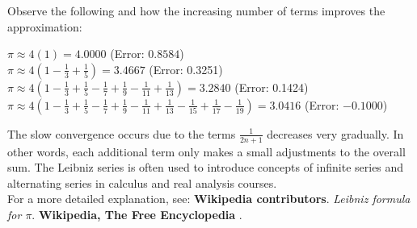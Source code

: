 \documentclass[12pt]{article}
\begin{document}
\noindent Observe the following and how the increasing number of terms improves the approximation:
\begin{center}
    $\pi \approx 4(1) = 4.0000$ (Error: $0.8584$)\\
    \vspace{3mm}
    $\pi \approx  4\left(1 - \frac{1}{3} + \frac{1}{5}\right) = 3.4667$ (Error: 0.3251)\\
    \vspace{3mm}
    $\pi \approx 4\left(1 - \frac{1}{3} + \frac{1}{5} - \frac{1}{7} + \frac{1}{9} - \frac{1}{11} + \frac{1}{13}\right) = 3.2840$ (Error: 0.1424)\\
    \vspace{3mm}
    $\pi \approx 4\left(1 - \frac{1}{3} + \frac{1}{5} - \frac{1}{7} + \frac{1}{9} - \frac{1}{11} + \frac{1}{13} - \frac{1}{15} + \frac{1}{17} - \frac{1}{19}\right) = 3.0416$ (Error: $-0.1000$)
\end{center}
The slow convergence occurs due to the terms $\frac{1}{2n+1}$ decreases very gradually. In other words, each additional term only makes a small adjustments to the overall sum. The Leibniz series is often used to introduce concepts of infinite series and alternating series in calculus and real analysis courses. \\

\noindent For a more detailed explanation, see: \textbf{Wikipedia contributors}. \textit{Leibniz formula for $\pi$}. \textbf{Wikipedia, The Free Encyclopedia} \cite{wikipedia_leibniz}. 

\newpage



\end{document}
